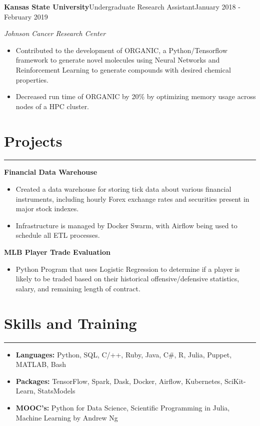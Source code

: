 \documentclass[11pt]{article}
\newcommand{\resumesection}[1]{\vspace{-0.2cm}\section*{#1}\vspace{-0.2cm}\hrule\vspace{0.2cm}}
\begin{document}
\textbf{Kansas State University}\hfill{Undergraduate Research Assistant}\hfill{January 2018 - February 2019} 

\textit{Johnson Cancer Research Center}
\begin{itemize}
	\item Contributed to the development of ORGANIC, a Python/Tensorflow framework to generate novel molecules using Neural Networks and Reinforcement Learning to generate compounds with desired chemical properties.
	\item Decreased run time of ORGANIC by 20\% by optimizing memory usage across nodes of a HPC cluster.
\end{itemize}

\resumesection{Projects}
\textbf{Financial Data Warehouse}
\begin{itemize}
	\item Created a data warehouse for storing tick data about various financial instruments, including hourly Forex exchange rates and securities present in major stock indexes.
	\item Infrastructure is managed by Docker Swarm, with Airflow being used to schedule all ETL processes.
\end{itemize}

\textbf{MLB Player Trade Evaluation}
\begin{itemize}
	\item Python Program that uses Logistic Regression to determine if a player is likely to be traded based on their historical offensive/defensive statistics, salary, and remaining length of contract.
\end{itemize}




\resumesection{Skills and Training}
\begin{itemize}
	\item \textbf{Languages:} Python, SQL, C/++, Ruby, Java, C\#, R, Julia, Puppet, MATLAB, Bash
	\item \textbf{Packages:} TensorFlow, Spark, Dask, Docker, Airflow, Kubernetes, SciKit-Learn, StatsModels
	\item \textbf{MOOC's:} Python for Data Science, Scientific Programming in Julia, Machine Learning by Andrew Ng
\end{itemize}
\end{document}
